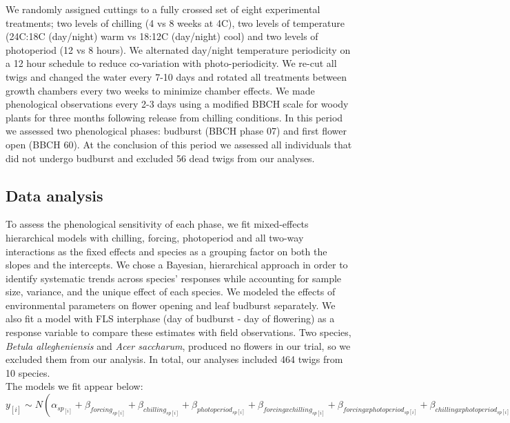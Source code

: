 \documentclass[11pt]{article}\usepackage[]{graphicx}\usepackage[]{color}
\begin{document}
\noindent We randomly assigned cuttings to a fully crossed set of eight experimental treatments; two levels of chilling (4 vs 8 weeks at 4\degree C), two levels of temperature (24\degree C:18\degree C (day/night) warm vs 18\degree:12\degree C (day/night) cool) and two levels of photoperiod (12 vs 8 hours). We alternated day/night temperature periodicity on a 12 hour schedule to reduce co-variation with photo-periodicity. We re-cut all twigs and changed the water every 7-10 days and rotated all treatments between growth chambers every two weeks to minimize chamber effects. We made phenological observations every 2-3 days using a modified BBCH scale for woody plants \citep{Finn2007} for three months following release from chilling conditions. In this period we assessed two phenological phases: budburst (BBCH phase 07) %
and first flower open (BBCH 60). At the conclusion of this period we assessed all individuals that did not undergo budburst and excluded 56 dead twigs from our analyses. 

\subsection*{Data analysis}
\noindent To assess the phenological sensitivity of each phase, we fit mixed-effects hierarchical models with chilling, forcing, photoperiod and all two-way interactions as the fixed effects and species as a grouping factor on both the slopes and the intercepts. We chose a Bayesian, hierarchical approach in order to identify systematic trends across species' responses while accounting for sample size, variance, and the unique effect of each species. We modeled the effects of environmental parameters on flower opening and leaf budburst separately. We also fit a model with FLS interphase (day of budburst - day of flowering) as a response variable to compare these estimates with field observations. Two species, \textit{Betula allegheniensis} and \textit{Acer saccharum}, produced no flowers in our trial, so we excluded them from our analysis. In total, our analyses included 464 twigs from 10 species. \\ 

The models we fit appear below:\\

$y_{[i]} \sim N(\alpha_{sp_{[i]}}+\beta_{forcing_{sp[i]}}+\beta_{chilling_{sp[i]}}+\beta_{photoperiod_{sp[i]}}+\beta_{forcing x chilling_{sp[i]}}+\beta_{forcing x photoperiod_{sp[i]}}+\beta_{chilling x photoperiod_{sp[i]}}, \sigma_y^2)$\\
\end{document}
